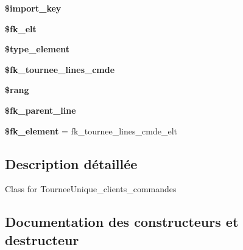\begin{DoxyCompactItemize}
\item 
\mbox{\label{classTourneeUnique__lines__cmde__elt_ab57bf0bd22794af53bc1713fc3cb8b39}} 
{\bfseries \$import\+\_\+key}
\item 
\mbox{\label{classTourneeUnique__lines__cmde__elt_a115988a72c0642615efe7009b61662f7}} 
{\bfseries \$fk\+\_\+elt}
\item 
\mbox{\label{classTourneeUnique__lines__cmde__elt_af04cf03f4c6339265353f8c86c049dbc}} 
{\bfseries \$type\+\_\+element}
\item 
\mbox{\label{classTourneeUnique__lines__cmde__elt_a2c4b119c0cf1ebcffa623ba64a2b4e60}} 
{\bfseries \$fk\+\_\+tournee\+\_\+lines\+\_\+cmde}
\item 
\mbox{\label{classTourneeUnique__lines__cmde__elt_a2952b4253e7280546f388d5f5f003833}} 
{\bfseries \$rang}
\item 
\mbox{\label{classTourneeUnique__lines__cmde__elt_afb7935c8670f7d5d3b4dc0491842e7c5}} 
{\bfseries \$fk\+\_\+parent\+\_\+line}
\item 
\mbox{\label{classTourneeUnique__lines__cmde__elt_a35af893d9ac67b676d13e4dd9590792c}} 
{\bfseries \$fk\+\_\+element} = \textquotesingle{}fk\+\_\+tournee\+\_\+lines\+\_\+cmde\+\_\+elt\textquotesingle{}
\end{DoxyCompactItemize}


\subsection{Description détaillée}
Class for Tournee\+Unique\+\_\+clients\+\_\+commandes 

\subsection{Documentation des constructeurs et destructeur}
\mbox{\label{classTourneeUnique__lines__cmde__elt_a8f392d1e26ead14d1f580729185505d6}} 
